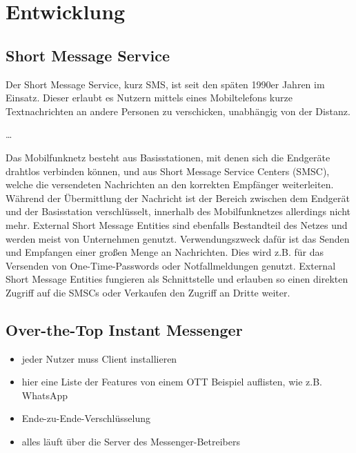 \documentclass[conference]{IEEEtran}
\begin{document}
\section{Entwicklung}

\subsection{Short Message Service}

Der Short Message Service, kurz SMS, ist seit den späten 1990er Jahren im Einsatz. Dieser erlaubt es Nutzern mittels eines Mobiltelefons kurze Textnachrichten an andere Personen zu verschicken, unabhängig von der Distanz. \cite{sendoutsms}

\dots

Das Mobilfunknetz besteht aus Basisstationen, mit denen sich die Endgeräte drahtlos verbinden können, und aus Short Message Service Centers (SMSC), welche die versendeten Nachrichten an den korrekten Empfänger weiterleiten. Während der Übermittlung der Nachricht ist der Bereich zwischen dem Endgerät und der Basisstation verschlüsselt, innerhalb des Mobilfunknetzes allerdings nicht mehr. External Short Message Entities sind ebenfalls Bestandteil des Netzes und werden meist von Unternehmen genutzt. Verwendungszweck dafür ist das Senden und Empfangen einer großen Menge an Nachrichten. Dies wird z.B. für das Versenden von One-Time-Passwords oder Notfallmeldungen genutzt. External Short Message Entities fungieren als Schnittstelle und erlauben so einen direkten Zugriff auf die SMSCs oder Verkaufen den Zugriff an Dritte weiter. \cite{sendoutsms}

\subsection{Over-the-Top Instant Messenger}

\begin{itemize}
    \item jeder Nutzer muss Client installieren
\end{itemize}
\cite{rcsmno}

\begin{itemize}
    \item hier eine Liste der Features von einem OTT Beispiel auflisten, wie z.B. WhatsApp
    \item Ende-zu-Ende-Verschlüsselung
    \item alles läuft über die Server des Messenger-Betreibers
\end{itemize}
\end{document}
